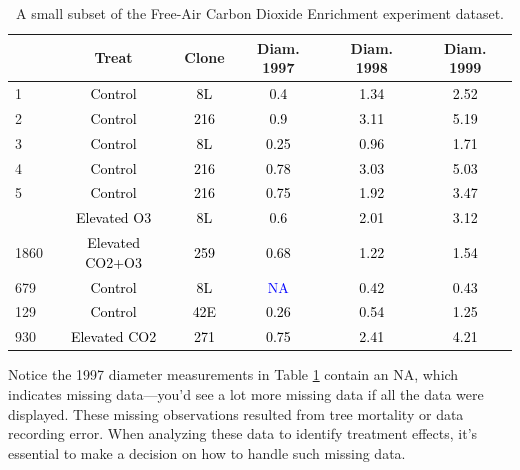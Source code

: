 \documentclass[
  11pt,
]{krantz}
\theoremstyle{definition}
\theoremstyle{definition}
\theoremstyle{definition}
\theoremstyle{definition}
\theoremstyle{remark}
\begin{document}
\begin{table}

\caption{\label{tab:face}A small subset of the Free-Air Carbon Dioxide Enrichment experiment dataset.}
\centering
\begin{tabular}[t]{lccccc}
\toprule
  & Treat & Clone & Diam. 1997 & Diam. 1998 & Diam. 1999\\
\midrule
1 & \textcolor{black}{Control} & \textcolor{black}{8L} & \textcolor{black}{0.4} & \textcolor{black}{1.34} & \textcolor{black}{2.52}\\
2 & \textcolor{black}{Control} & \textcolor{black}{216} & \textcolor{black}{0.9} & \textcolor{black}{3.11} & \textcolor{black}{5.19}\\
3 & \textcolor{black}{Control} & \textcolor{black}{8L} & \textcolor{black}{0.25} & \textcolor{black}{0.96} & \textcolor{black}{1.71}\\
4 & \textcolor{black}{Control} & \textcolor{black}{216} & \textcolor{black}{0.78} & \textcolor{black}{3.03} & \textcolor{black}{5.03}\\
5 & \textcolor{black}{Control} & \textcolor{black}{216} & \textcolor{black}{0.75} & \textcolor{black}{1.92} & \textcolor{black}{3.47}\\
\addlinespace
1017 & \textcolor{black}{Elevated O3} & \textcolor{black}{8L} & \textcolor{black}{0.6} & \textcolor{black}{2.01} & \textcolor{black}{3.12}\\
1860 & \textcolor{black}{Elevated CO2+O3} & \textcolor{black}{259} & \textcolor{black}{0.68} & \textcolor{black}{1.22} & \textcolor{black}{1.54}\\
679 & \textcolor{black}{Control} & \textcolor{black}{8L} & \textcolor{blue}{NA} & \textcolor{black}{0.42} & \textcolor{black}{0.43}\\
129 & \textcolor{black}{Control} & \textcolor{black}{42E} & \textcolor{black}{0.26} & \textcolor{black}{0.54} & \textcolor{black}{1.25}\\
930 & \textcolor{black}{Elevated CO2} & \textcolor{black}{271} & \textcolor{black}{0.75} & \textcolor{black}{2.41} & \textcolor{black}{4.21}\\
\bottomrule
\end{tabular}
\end{table}

Notice the 1997 diameter measurements in Table \ref{tab:face} contain an NA, which indicates missing data---you'd see a lot more missing data if all the data were displayed. These missing observations resulted from tree mortality or data recording error. When analyzing these data to identify treatment effects, it's essential to make a decision on how to handle such missing data.
\end{document}
